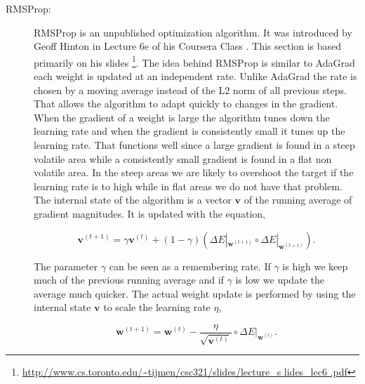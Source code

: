 \begin{description}

    \item[\gls{RMSProp}:]

        \gls{RMSProp} is an unpublished optimization algorithm.
        It was introduced by Geoff Hinton in Lecture 6e of his
        Coursera Class \citep{DBLP:journals/corr/Ruder16}.
        This section is based primarily on his slides
        \footnote{\url{http://www.cs.toronto.edu/~tijmen/csc321/slides/lecture_s
        lides_lec6 .pdf}}. The idea behind \gls{RMSProp} is similar to
        \gls{AdaGrad} each weight is updated at an independent rate. Unlike
        \gls{AdaGrad} the rate is chosen by a moving average instead of the
        L2 norm of all previous steps. That allows the algorithm to adapt
        quickly to changes in the gradient. When the gradient of a weight is
        large the algorithm tunes down the learning rate and when the gradient
        is consistently small it tunes up the learning rate. That functions
        well since a large gradient is found in a steep volatile area while a
        consistently small gradient is found in a flat non volatile area. In the
        steep areas we are likely to overshoot the target if the learning rate
        is to high while in flat areas we do not have that problem. The internal
        state of the algorithm is a vector $\mathbf{v}$ of the running average
        of gradient magnitudes. It is updated with the equation,

        \begin{equation}
            \label{eq:rms_prop_state}
            \mathbf{v}^{(t+1)} =
                \gamma\mathbf{v}^{(t)} +
                (1 - \gamma)\left(
                    \Delta E|_{\mathbf{w}^{(t + 1)}} \circ
                    \Delta E|_{\mathbf{w}^{(t + 1)}}
                \right).
        \end{equation}

        The parameter $\gamma$ can be seen as a remembering rate. If $\gamma$
        is high we keep much of the previous running average and if $\gamma$
        is low we update the average much quicker. The actual weight update is
        performed by using the internal state $\mathbf{v}$ to scale the learning
        rate $\eta$,

        \begin{equation}
            \mathbf{w}^{(t+1)} =
                \mathbf{w}^{(t)} -
                \frac{\eta}{\sqrt{\mathbf{v}^{(t)}}} \circ
                \Delta E|_{\mathbf{w}^{(t)}}.
        \end{equation}


\end{description}
